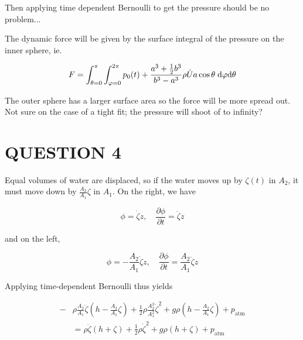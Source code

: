 \documentclass[a4paper]{article}
\begin{document}
Then applying time dependent Bernoulli to get the pressure should be no problem...

The dynamic force will be given by the surface integral of the pressure on the inner sphere, ie.

\[ F = \int_{\theta = 0}^{\pi} \int_{\varphi = 0}^{2\pi} p_{0}(t) + \frac{a^{3} + \frac{1}{2} b^{3}}{b^{3} - a^{3}} \rho \dot{U} a \cos \theta \; \mathrm{d} \varphi \mathrm{d} \theta \]

The outer sphere has a larger surface area so the force will be more spread out. Not sure on the case of a tight fit; the pressure will shoot of to infinity?


\section{QUESTION 4}

\begin{center}
\end{center}

Equal volumes of water are displaced, so if the water moves up by $ \zeta(t) $ in $ A_{2} $, it must move down by $ \frac{A_{2}}{A_{1}} \zeta $ in $ A_{1} $. On the right, we have

\[ \phi = \dot{\zeta} z, \quad \frac{\partial \phi }{\partial t} = \ddot{\zeta} z \]

and on the left,

\[ \phi = - \frac{A_{2}}{A_{1}} \dot{\zeta} z, \quad  \frac{\partial \phi }{\partial t} = \frac{A_{2}}{A_{1}} \ddot{\zeta} z   \]

Applying time-dependent Bernoulli thus yields

\begin{align*}
- & \rho \frac{A_{2}}{A_{1}} \ddot{\zeta} (h - \frac{A_{2}}{A_{1}} \zeta) +  \frac{1}{2} \rho \frac{A_{2}^{2}}{A_{1}^{2}} \dot{\zeta}^{2} + g \rho ( h - \frac{A_{2}}{A_{1}} \zeta) + p_{\text{atm}} \\
& = \rho \ddot{\zeta} (h + \zeta) + \frac{1}{2} \rho \dot{\zeta}^{2} + g \rho ( h + \zeta) + p_{\text{atm}}
\end{align*}
\end{document}
